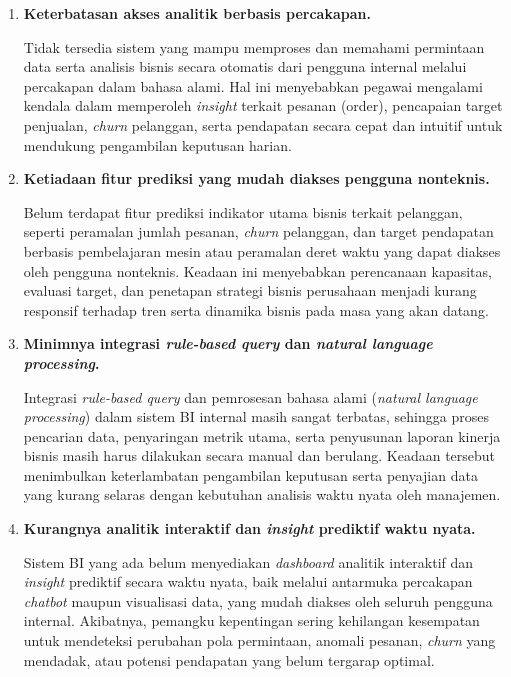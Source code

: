 \begin{enumerate}
  \item \textbf{Keterbatasan akses analitik berbasis percakapan.}
  
  Tidak tersedia sistem yang mampu memproses dan memahami permintaan data serta analisis bisnis secara otomatis dari pengguna internal melalui percakapan dalam bahasa alami. Hal ini menyebabkan pegawai mengalami kendala dalam memperoleh \textit{insight} terkait pesanan (order), pencapaian target penjualan, \textit{churn} pelanggan, serta pendapatan secara cepat dan intuitif untuk mendukung pengambilan keputusan harian.

  \item \textbf{Ketiadaan fitur prediksi yang mudah diakses pengguna nonteknis.}
  
  Belum terdapat fitur prediksi indikator utama bisnis terkait pelanggan, seperti peramalan jumlah pesanan, \textit{churn} pelanggan, dan target pendapatan berbasis pembelajaran mesin atau peramalan deret waktu yang dapat diakses oleh pengguna nonteknis. Keadaan ini menyebabkan perencanaan kapasitas, evaluasi target, dan penetapan strategi bisnis perusahaan menjadi kurang responsif terhadap tren serta dinamika bisnis pada masa yang akan datang.

  \item \textbf{Minimnya integrasi \textit{rule-based query} dan \textit{natural language processing}.}
  
  Integrasi \textit{rule-based query} dan pemrosesan bahasa alami (\textit{natural language processing}) dalam sistem BI internal masih sangat terbatas, sehingga proses pencarian data, penyaringan metrik utama, serta penyusunan laporan kinerja bisnis masih harus dilakukan secara manual dan berulang. Keadaan tersebut menimbulkan keterlambatan pengambilan keputusan serta penyajian data yang kurang selaras dengan kebutuhan analisis waktu nyata oleh manajemen.

  \item \textbf{Kurangnya analitik interaktif dan \textit{insight} prediktif waktu nyata.}
  
  Sistem BI yang ada belum menyediakan \textit{dashboard} analitik interaktif dan \textit{insight} prediktif secara waktu nyata, baik melalui antarmuka percakapan \textit{chatbot} maupun visualisasi data, yang mudah diakses oleh seluruh pengguna internal. Akibatnya, pemangku kepentingan sering kehilangan kesempatan untuk mendeteksi perubahan pola permintaan, anomali pesanan, \textit{churn} yang mendadak, atau potensi pendapatan yang belum tergarap optimal.
\end{enumerate}

